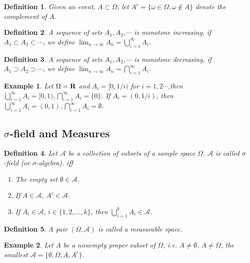 \documentclass[11pt]{article}
\def\R{{\bf R}}
\def\MA{{\mathcal A}}
\newtheorem{definition}{Definition}[section]
\newtheorem{example}{Example}[section]
\begin{document}
\begin{definition}
Given an event, $A\subset \Omega$, let $A^c = \{\omega \in \Omega, \omega \notin A\}$
denote the complement of $A$.
\end{definition}

\begin{definition}
A sequence of sets $A_1, A_2, \cdots$ is \emph{monotone increasing},
if $A_1 \subset A_2 \subset \cdots$, we define $\displaystyle\lim_{n\rightarrow \infty} A_n = \bigcup_{i = 1}^{\infty}A_i$.
\end{definition}

\begin{definition}
A sequence of sets $A_1, A_2, \cdots$ is \emph{monotone decreasing},
if $A_1 \supset A_2 \supset \cdots$, we define $\displaystyle\lim_{n\rightarrow \infty} A_n = \bigcap_{i = 1}^{\infty}A_i$.
\end{definition}

\begin{example}
Let $\Omega = \R$ and $A_i = [0, 1/i)$ for $i = 1, 2\cdots$,then \\
$\displaystyle \bigcup_{i = 1}^{\infty}A_i = [0, 1), \displaystyle \bigcap_{i = 1}^{\infty}A_i = \{0\}$.
If $A_i = (0, 1/i)$, then $\displaystyle \bigcup_{i = 1}^{\infty}A_i = (0, 1), \displaystyle \bigcap_{i = 1}^{\infty}A_i = \emptyset$.
\end{example}

\subsection{$\sigma$-field and Measures}
\begin{definition}
Let $\MA$ be a collection of subsets of a sample space $\Omega$. $\MA$ is called $\sigma$-field (or $\sigma$-algebra).
iff
\begin{enumerate}
\item The empty set $\emptyset \in \MA$.
\item If $A \in \MA$, $A^c \in \MA$.
\item If $A_i \in \MA$, $i \in \{1,2, ..., k\}$, then $\displaystyle\bigcup_{i=1}^k A_i \in \MA$.
\end{enumerate}
\end{definition}

\begin{definition}
A pair $(\Omega, \MA)$ is called a measurable space.
\end{definition}

\begin{example}
Let $A$ be a nonempty proper subset of $\Omega$, i.e. $A \neq \emptyset$, $A\neq \Omega$,
the smallest $\MA = \{\emptyset, \Omega, A, A^c\}$.
\end{example}
\end{document}
